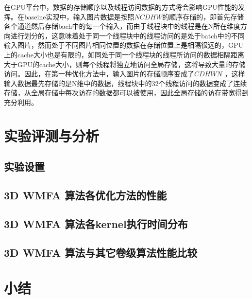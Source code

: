 在GPU平台中，数据的存储顺序以及线程访问数据的方式将会影响GPU性能的发挥。在baseine实现中，输入图片数据是按照$NCDHW$的顺序存储的，即首先存储各个通道然后存储bach中的每一个输入，而由于线程块中的线程是在N所在维度方向进行划分的，这意味着处于同一个线程块中的线程访问的是处于batch中的不同输入图片，然而处于不同图片相同位置的数据在存储位置上是相隔很远的，GPU上的cache大小也是有限的，如同处于同一个线程块的线程所访问的数据相隔距离大于GPU的cache大小，则每个线程将独立地访问全局存储，这将导致大量的存储访问。因此，在第一种优化方法中，输入图片的存储顺序变成了$CDHWN$ ，这样输入数据最先存储的是N维中的数据，线程块中的32个线程访问的数据变成了连续存储，从全局存储中每次访存的数据都可以被使用，因此全局存储的访存带宽得到充分利用。


\section{实验评测与分析}
\subsection{实验设置}


\subsection{3D WMFA 算法各优化方法的性能}


\subsection{3D WMFA 算法各kernel执行时间分布}


\subsection{3D WMFA 算法与其它卷级算法性能比较}


\section{小结}

